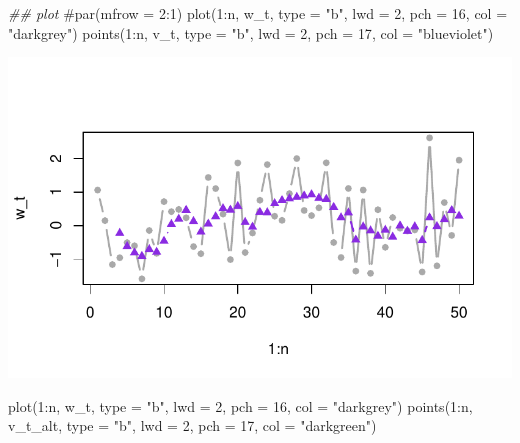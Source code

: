 \documentclass[
  letterpaper,
  DIV=11,
  numbers=noendperiod]{scrreprt}
\newenvironment{Shaded}{\begin{snugshade}}{\end{snugshade}}
\newcommand{\AttributeTok}[1]{\textcolor[rgb]{0.40,0.45,0.13}{#1}}
\newcommand{\CommentTok}[1]{\textcolor[rgb]{0.37,0.37,0.37}{#1}}
\newcommand{\DecValTok}[1]{\textcolor[rgb]{0.68,0.00,0.00}{#1}}
\newcommand{\DocumentationTok}[1]{\textcolor[rgb]{0.37,0.37,0.37}{\textit{#1}}}
\newcommand{\FunctionTok}[1]{\textcolor[rgb]{0.28,0.35,0.67}{#1}}
\newcommand{\NormalTok}[1]{\textcolor[rgb]{0.00,0.23,0.31}{#1}}
\newcommand{\SpecialCharTok}[1]{\textcolor[rgb]{0.37,0.37,0.37}{#1}}
\newcommand{\StringTok}[1]{\textcolor[rgb]{0.13,0.47,0.30}{#1}}
\begin{document}
\begin{Shaded}
\begin{Highlighting}[]
\DocumentationTok{\#\# plot}
\CommentTok{\#par(mfrow = 2:1)}
\FunctionTok{plot}\NormalTok{(}\DecValTok{1}\SpecialCharTok{:}\NormalTok{n, w\_t, }\AttributeTok{type =} \StringTok{"b"}\NormalTok{, }\AttributeTok{lwd =} \DecValTok{2}\NormalTok{, }\AttributeTok{pch =} \DecValTok{16}\NormalTok{, }\AttributeTok{col =} \StringTok{"darkgrey"}\NormalTok{)}
\FunctionTok{points}\NormalTok{(}\DecValTok{1}\SpecialCharTok{:}\NormalTok{n, v\_t, }\AttributeTok{type =} \StringTok{"b"}\NormalTok{, }\AttributeTok{lwd =} \DecValTok{2}\NormalTok{, }\AttributeTok{pch =} \DecValTok{17}\NormalTok{, }\AttributeTok{col =} \StringTok{"blueviolet"}\NormalTok{)}
\end{Highlighting}
\end{Shaded}

\includegraphics{LectureNotes/Lecture2_files/figure-pdf/unnamed-chunk-14-1.pdf}

\begin{Shaded}
\begin{Highlighting}[]
\FunctionTok{plot}\NormalTok{(}\DecValTok{1}\SpecialCharTok{:}\NormalTok{n, w\_t, }\AttributeTok{type =} \StringTok{"b"}\NormalTok{, }\AttributeTok{lwd =} \DecValTok{2}\NormalTok{, }\AttributeTok{pch =} \DecValTok{16}\NormalTok{, }\AttributeTok{col =} \StringTok{"darkgrey"}\NormalTok{)}
\FunctionTok{points}\NormalTok{(}\DecValTok{1}\SpecialCharTok{:}\NormalTok{n, v\_t\_alt, }\AttributeTok{type =} \StringTok{"b"}\NormalTok{, }\AttributeTok{lwd =} \DecValTok{2}\NormalTok{, }\AttributeTok{pch =} \DecValTok{17}\NormalTok{, }\AttributeTok{col =} \StringTok{"darkgreen"}\NormalTok{)}
\end{Highlighting}
\end{Shaded}
\end{document}
